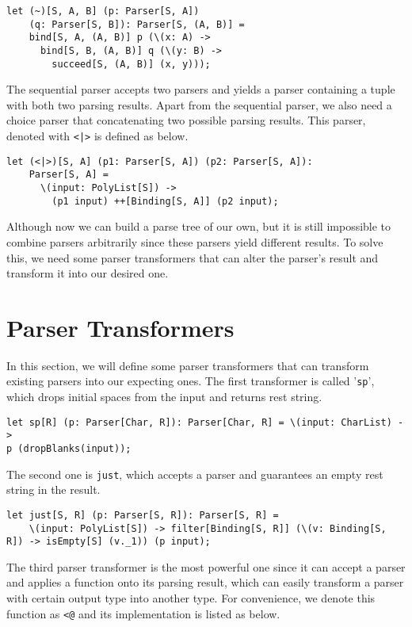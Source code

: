 \begin{lstlisting}
let (~)[S, A, B] (p: Parser[S, A])
    (q: Parser[S, B]): Parser[S, (A, B)] =
	bind[S, A, (A, B)] p (\(x: A) ->
	  bind[S, B, (A, B)] q (\(y: B) ->
	    succeed[S, (A, B)] (x, y)));
\end{lstlisting}

The sequential parser accepts two parsers and yields a parser containing a tuple with both two parsing results. Apart from the sequential parser, we also need a choice parser that concatenating two possible parsing results. This parser, denoted with \texttt{<|>} is defined as below.

\begin{lstlisting}
let (<|>)[S, A] (p1: Parser[S, A]) (p2: Parser[S, A]):
    Parser[S, A] =
	  \(input: PolyList[S]) ->
	    (p1 input) ++[Binding[S, A]] (p2 input);
\end{lstlisting}

Although now we can build a parse tree of our own, but it is still impossible to combine parsers arbitrarily since these parsers yield different results. To solve this, we need some parser transformers that can alter the parser's result and transform it into our desired one.

\section{Parser Transformers}
In this section, we will define some parser transformers that can transform existing parsers into our expecting ones. The first transformer is called '\texttt{sp}', which drops initial spaces from the input and returns rest string.

\begin{lstlisting}
let sp[R] (p: Parser[Char, R]): Parser[Char, R] = \(input: CharList) ->
p (dropBlanks(input));
\end{lstlisting}

The second one is \texttt{just}, which accepts a parser and guarantees an empty rest string in the result.

\begin{lstlisting}
let just[S, R] (p: Parser[S, R]): Parser[S, R] =
    \(input: PolyList[S]) -> filter[Binding[S, R]] (\(v: Binding[S, R]) -> isEmpty[S] (v._1)) (p input);
\end{lstlisting}

The third parser transformer is the most powerful one since it can accept a parser and applies a function onto its parsing result, which can easily transform a parser with certain output type into another type. For convenience, we denote this function as \texttt{<@} and its implementation is listed as below.


